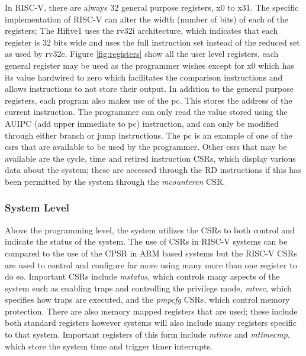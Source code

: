 In RISC-V, there are always 32 general purpose registers, x0 to x31. The specific implementation of RISC-V can alter the width (number of bits) of each of the registers; The Hifive1 uses the rv32i architecture, which indicates that each register is 32 bits wide and uses the full instruction set instead of the reduced set as used by rv32e. Figure \ref{fig:registers} show all the user level registers, each general register may be used as the programmer wishes except for x0 which has its value hardwired to zero which facilitates the comparison instructions and allows instructions to not store their output. In addition to the general purpose registers, each program also makes use of the \ac{pc}. This stores the address of the current instruction. The programmer can only read the value stored using the AUIPC (add upper immediate to pc) instruction, and can only be modified through either branch or jump instructions. The pc is an example of one of the  \ac{csrs} that are available to be used by the programmer. Other \ac{csrs} that may be available are the cycle, time and retired instruction CSRs, which display various data about the system; these are accessed through the RD instructions if this has been permitted by the system through the \textit{mcounteren} CSR.
\subsubsection{System Level}
Above the programming level, the system utilizes the CSRs to both control and indicate the status of the system. The use of CSRs in RISC-V systems can be compared to the use of the CPSR in ARM based systems but the RISC-V CSRs are used to control and configure far more using many more than one register to do so. Important CSRs include \textit{mstatus}, which controls many aspects of the system such as enabling traps and controlling the privilege mode, \textit{mtvec}, which specifies how traps are executed, and the \textit{pmpcfg} CSRs, which control memory protection. There are also memory mapped registers that are used; these include both standard registers however systems will also include many registers specific to that system. Important registers of this form include \textit{mtime} and \textit{mtimecmp}, which store the system time and trigger timer interrupts.
